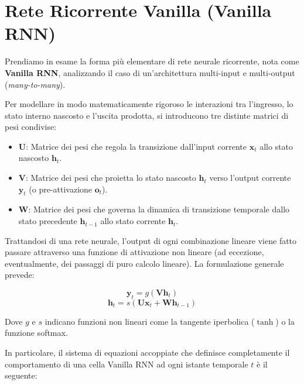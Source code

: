 ﻿\documentclass[11pt, a4paper]{article}
\begin{document}
\section{Rete Ricorrente Vanilla (Vanilla RNN)}

Prendiamo in esame la forma più elementare di rete neurale ricorrente, nota come \textbf{Vanilla RNN}, analizzando il caso di un'architettura multi-input e multi-output (\emph{many-to-many}).


Per modellare in modo matematicamente rigoroso le interazioni tra l'ingresso, lo stato interno nascosto e l'uscita prodotta, si introducono tre distinte matrici di pesi condivise:


\begin{itemize}[noitemsep]
    \item $\bm{U}$: Matrice dei pesi che regola la transizione dall'input corrente $\bm{x}_t$ allo stato nascosto $\bm{h}_t$.
    \item $\bm{V}$: Matrice dei pesi che proietta lo stato nascosto $\bm{h}_t$ verso l'output corrente $\bm{y}_t$ (o pre-attivazione $\bm{o}_t$).
    \item $\bm{W}$: Matrice dei pesi che governa la dinamica di transizione temporale dallo stato precedente $\bm{h}_{t-1}$ allo stato corrente $\bm{h}_t$.
\end{itemize}

Trattandosi di una rete neurale, l'output di ogni combinazione lineare viene fatto passare attraverso una funzione di attivazione non lineare (ad eccezione, eventualmente, dei passaggi di puro calcolo lineare). La formulazione generale prevede:

\[
\bm{y}_t = g(\bm{V}\bm{h}_t)
\]
\[
\bm{h}_t = s(\bm{U}\bm{x}_t + \bm{W}\bm{h}_{t-1})
\]

Dove $g$ e $s$ indicano funzioni non lineari come la tangente iperbolica ($\tanh$) o la funzione softmax.

In particolare, il sistema di equazioni accoppiate che definisce completamente il comportamento di una cella Vanilla RNN ad ogni istante temporale $t$ è il seguente:
\end{document}
